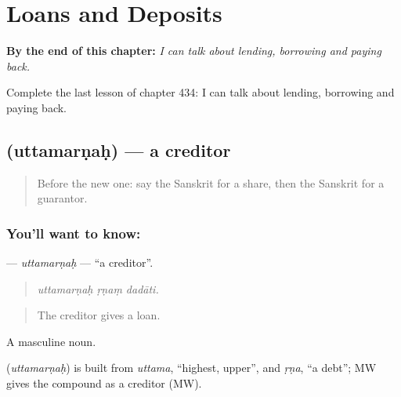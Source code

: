 
\chapter{Loans and Deposits}
\label{ch:sa-loans-and-deposits}

\begin{chapteropening}
\textbf{By the end of this chapter:} \emph{I can talk about lending, borrowing and paying back.}

Complete the last lesson of chapter 434: I can talk about lending, borrowing and paying back.
\end{chapteropening}

\section[\texorpdfstring{\sk{उत्तमर्णः} (uttamarṇaḥ)}{उत्तमर्णः (uttamarṇaḥ)}]{ (uttamarṇaḥ) — a creditor}

\label{lesson:SA-C434-uttamarnah}



\begin{quote}
Before the new one: say the Sanskrit for a share, then the Sanskrit for a guarantor.
\end{quote}

\subsection*{You'll want to know: }
\textbf{} — \emph{uttamarṇaḥ} — \textquotedblleft{}a creditor\textquotedblright{}.

\begin{quote}
  
\end{quote}

\begin{quote}
\emph{uttamarṇaḥ ṛṇaṃ dadāti.}
\end{quote}

\begin{quote}
The creditor gives a loan.
\end{quote}

A masculine noun.

\begin{cousinweb}
\textbf{} (\emph{uttamarṇaḥ}) is built from \emph{uttama}, \textquotedblleft{}highest, upper\textquotedblright{}, and \emph{ṛṇa}, \textquotedblleft{}a debt\textquotedblright{}; MW gives the compound as a creditor (MW).
\end{cousinweb}

